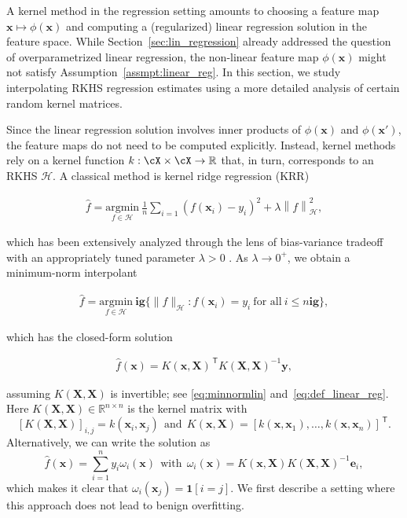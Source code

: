 A kernel method in the regression setting amounts to choosing a feature map ${\boldsymbol x}\mapsto \phi({\boldsymbol x})$ and computing a (regularized) linear regression solution in the feature space. While
Section~\ref{sec:lin_regression} already addressed the question of overparametrized linear regression, the non-linear feature map
$\phi({\boldsymbol x})$ might not satisfy Assumption~\ref{assmpt:linear_reg}.
In this section, we study interpolating RKHS regression estimates using a more detailed analysis of certain random kernel matrices.

Since the linear regression solution involves inner products of
$\phi({\boldsymbol x})$ and $\phi({\boldsymbol x}')$, the feature maps do not need to be computed explicitly. Instead, kernel methods rely on a kernel function $k:\cX\times\cX\to {\mathbb R}$ that, in turn, corresponds to an RKHS ${\mathcal H}$. A classical method is kernel ridge regression (KRR)

\begin{align}
	\widehat{f} = \underset{f\in{\mathcal H}}{\mathrm{argmin}} \  \frac{1}{n}\sum_{i=1} (f({\boldsymbol x}_i)-y_i)^2 + \lambda\left\|f\right\|^2_{{\mathcal H}},
\end{align}

which has been extensively analyzed through the lens of bias-variance tradeoff with an appropriately tuned parameter $\lambda>0$ \cite{caponnetto2007optimal}. As $\lambda\to 0^+$, we obtain a minimum-norm interpolant

\begin{align}
	\label{eq:kernel_min_norm_interpolant}
	\widehat{f} = \underset{f\in{\mathcal H}}{\mathrm{argmin}} \  \mathbf{ig}\{ \| f \|_{{\mathcal H}}: f({\boldsymbol x}_i) = y_i ~\text{for all}~ i \leq n \mathbf{ig}\},
\end{align}

which has the closed-form solution

\begin{align}
	\widehat{f}({\boldsymbol x}) = 
    K({\boldsymbol x},{\boldsymbol X})^\ensuremath{{\scriptscriptstyle\mathsf{\,T}}} K({\boldsymbol X},{\boldsymbol X})^{-1} {\boldsymbol y},
\end{align}

assuming $K({\boldsymbol X},{\boldsymbol X})$ is invertible; see \eqref{eq:minnormlin}
and~\eqref{eq:def_linear_reg}. Here $K({\boldsymbol X},{\boldsymbol X})\in{\mathbb R}^{n\times n}$ is the kernel matrix with $$[K({\boldsymbol X},{\boldsymbol X})]_{i,j} = k({\boldsymbol x}_i,{\boldsymbol x}_j) ~~\text{and}~~ K({\boldsymbol x},{\boldsymbol X})=[k({\boldsymbol x},{\boldsymbol x}_1),\ldots,k({\boldsymbol x},{\boldsymbol x}_n)]^\ensuremath{{\scriptscriptstyle\mathsf{\,T}}}.$$
Alternatively, we can write the solution as 
$$\widehat{f}({\boldsymbol x}) = \sum_{i=1}^n y_i \omega_i({\boldsymbol x}) ~~\text{with}~~ \omega_i({\boldsymbol x}) = K({\boldsymbol x},{\boldsymbol X}) K({\boldsymbol X},{\boldsymbol X})^{-1}{\boldsymbol e}_i,$$ which makes it clear that $\omega_i({\boldsymbol x}_j)=\ensuremath{\boldsymbol{1}\left[i=j\right]}$.
We first describe a setting where this approach does not lead to benign overfitting.

